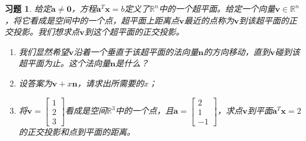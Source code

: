 \documentclass[UTF8]{ctexart}
\newtheorem{ex}[thm]{习题}
\begin{document}
\begin{ex}
给定$\bm a\neq \bm 0$，方程$\bm a^{T}\bm x=b$定义了$\mathbb{R}^n$中的一个超平面。给定一个向量$\bm v\in\mathbb{R}^n$，将它看成是空间中的一个点，超平面上距离点$\bm v$最近的点称为$\bm v$到该超平面的正交投影。我们想求点$\bm v$到这个超平面的正交投影。
\begin{enumerate}
\item 我们显然希望$\bm v$沿着一个垂直于该超平面的法向量$\bm n$的方向移动，直到$\bm v$碰到该超平面为止。这个法向量$\bm n$是什么？
\item 设答案为$\bm v+x\bm n$，请求出所需要的$x$；
\item 将$\bm v=\begin{bmatrix}1\\2\\3\end{bmatrix}$看成是空间$\mathbb{R}^3$中的一个点，且$\bm a=\begin{bmatrix}2\\1\\-1\end{bmatrix}$，求点$\bm v$到平面$\bm a^{T}\bm x=2$的正交投影和点到平面的距离。
\end{enumerate}
\end{ex}
\end{document}
